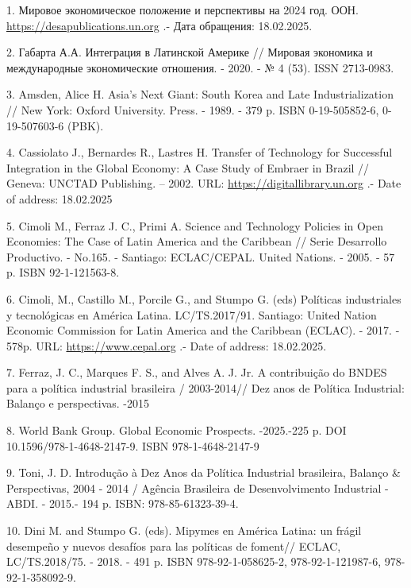 \begin{references}
1. Мировое экономическое положение и перспективы на 2024 год. ООН.
\href{https://desapublications.un.org/sites/default/files/publications/2024-03/WESP\%202024_Executive\%20Summary_Russian_0.pdf}{https://desapublications.un.org}
.- Дата обращения: 18.02.2025.

2. Габарта А.А. Интеграция в Латинской Америке // Мировая экономика и
международные экономические отношения. - 2020. - № 4 (53). ISSN
2713-0983.

3. Amsden, Alice H. Asia's Next Giant: South Korea and Late
Industrialization // New York: Oxford University. Press. - 1989. - 379
p. ISBN 0-19-505852-6, 0-19-507603-6 (PBK).

4. Cassiolato J., Bernardes R., Lastres H. Transfer of Technology for
Successful Integration in the Global Economy: A Case Study of Embraer in
Brazil // Geneva: UNCTAD Publishing. -- 2002. URL:
\href{https://digitallibrary.un.org/record/479842?v=pdf}{https://digitallibrary.un.org} .- Date of
address: 18.02.2025

5. Cimoli M., Ferraz J. C., Primi A. Science and Technology Policies in
Open Economies: The Case of Latin America and the Caribbean // Serie
Desarrollo Productivo. - No.165. - Santiago: ECLAC/CEPAL. United
Nations. - 2005. - 57 p. ISBN 92-1-121563-8.

6. Cimoli, M., Castillo M., Porcile G., and Stumpo G. (eds) Políticas
industriales y tecnológicas en América Latina. LC/TS.2017/91. Santiago:
United Nation Economic Commission for Latin America and the Caribbean
(ECLAC). - 2017. - 578p. URL:
\href{https://www.cepal.org/es/publicaciones/42363-politicasindustriales-tecnologicas-america-latina}{https://www.cepal.org} .-
Date of address: 18.02.2025.

7. Ferraz, J. C., Marques F. S., and Alves A. J. Jr. A contribuição do
BNDES para a política industrial brasileira / 2003-2014// Dez anos de
Política Industrial: Balanço e perspectivas. -2015

8. World Bank Group. Global Economic Prospects. -2025.-225 p. DOI
10.1596/978-1-4648-2147-9. ISBN 978-1-4648-2147-9

9. Toni, J. D. Introdução à Dez Anos da Política Industrial brasileira,
Balanço \& Perspectivas, 2004 - 2014 / Agência Brasileira de
Desenvolvimento Industrial - ABDI. - 2015.- 194 p. ISBN:
978-85-61323-39-4.

10. Dini M. and Stumpo G. (eds). Mipymes en América Latina: un frágil
desempeño y nuevos desafíos para las políticas de foment// ECLAC,
LC/TS.2018/75. - 2018. - 491 p. ISBN 978-92-1-058625-2,
978-92-1-121987-6, 978-92-1-358092-9.


\end{references}
